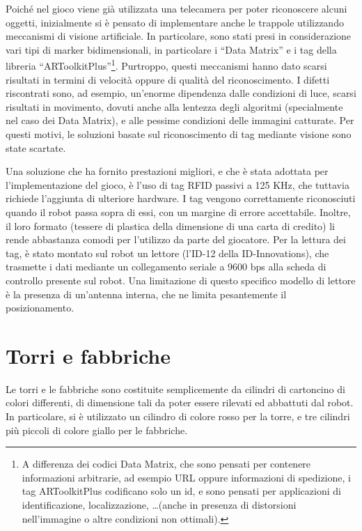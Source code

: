 Poiché nel gioco viene già utilizzata una telecamera per poter riconoscere alcuni oggetti, inizialmente si è pensato di implementare anche le trappole utilizzando meccanismi di visione artificiale. In particolare, sono stati presi in considerazione vari tipi di marker bidimensionali, in particolare i ``Data Matrix'' e i tag della libreria ``ARToolkitPlus''\footnote{A differenza dei codici Data Matrix, che sono pensati per contenere informazioni arbitrarie, ad esempio URL oppure informazioni di spedizione, i tag ARToolkitPlus codificano solo un id, e sono pensati per applicazioni di identificazione, localizzazione, \dots (anche in presenza di distorsioni nell'immagine o altre condizioni non ottimali).}. Purtroppo, questi meccanismi hanno dato scarsi risultati in termini di velocità oppure di qualità del riconoscimento. I difetti riscontrati sono, ad esempio, un'enorme dipendenza dalle condizioni di luce, scarsi risultati in movimento, dovuti anche alla lentezza degli algoritmi (specialmente nel caso dei Data Matrix), e alle pessime condizioni delle immagini catturate. Per questi motivi, le soluzioni basate sul riconoscimento di tag mediante visione sono state scartate.

Una soluzione che ha fornito prestazioni migliori, e che è stata adottata per l'implementazione del gioco, è l'uso di tag RFID passivi a 125 KHz, che tuttavia richiede l'aggiunta di ulteriore hardware. I tag vengono correttamente riconosciuti quando il robot passa sopra di essi, con un margine di errore accettabile. Inoltre, il loro formato (tessere di plastica della dimensione di una carta di credito) li rende abbastanza comodi per l'utilizzo da parte del giocatore. Per la lettura dei tag, è stato montato sul robot un lettore (l'ID-12 della ID-Innovations), che trasmette i dati mediante un collegamento seriale a 9600 bps alla scheda di controllo presente sul robot. Una limitazione di questo specifico modello di lettore è la presenza di un'antenna interna, che ne limita pesantemente il posizionamento.

\section{Torri e fabbriche}
Le torri e le fabbriche sono costituite semplicemente da cilindri di cartoncino di colori differenti, di dimensione tali da poter essere rilevati ed abbattuti dal robot. In particolare, si è utilizzato un cilindro di colore rosso per la torre, e tre cilindri più piccoli di colore giallo per le fabbriche. 

